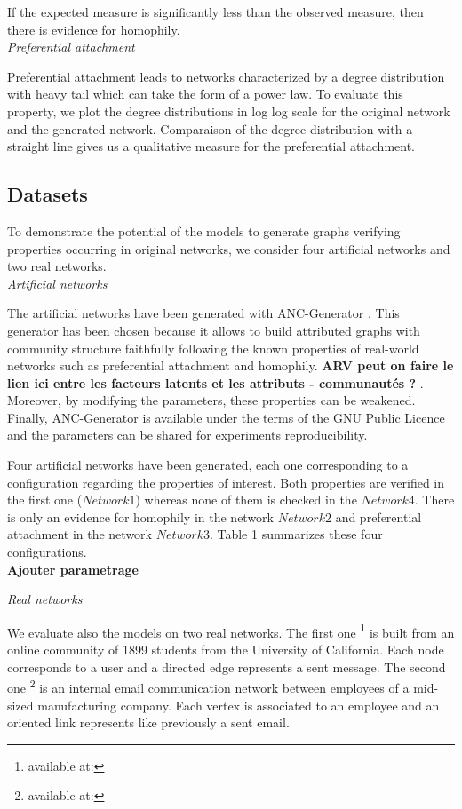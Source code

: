 If the expected measure is significantly less than the observed measure, then there is evidence for homophily.\\

\textit{Preferential attachment}

Preferential attachment leads to networks characterized by a degree distribution with heavy tail which can take the form of a power law. To evaluate this property, we  plot the degree distributions in log log scale for the original network and the generated network. Comparaison of the degree distribution with a straight line gives us a qualitative measure for the preferential attachment.\\

\subsection{Datasets}
To demonstrate the potential of the models to generate graphs verifying properties occurring in original networks, we consider four artificial networks and two real networks.\\

\textit{Artificial networks}

The artificial networks have been generated with ANC-Generator \cite{largeron2015}. This generator has been chosen because it allows to build attributed graphs with community structure faithfully following the known properties of real-world networks such as preferential attachment and homophily. 
\textbf{ ARV peut on faire le lien ici entre les facteurs latents et les attributs - communautés ? }.
Moreover, by modifying the parameters, these properties can be weakened. Finally, ANC-Generator is available under the terms of the GNU Public Licence and the parameters can be shared for experiments reproducibility. 

Four artificial networks have been generated, each one corresponding to a configuration  regarding the properties of interest.
Both properties are verified in the first one ($Network1$) whereas none of them is checked in the $Network4$.  There is only an evidence for homophily in the network $Network2$ and  preferential attachment in the network  $Network3$. Table 1 summarizes these four configurations. \\ 

\textbf{Ajouter parametrage}  

\textit{Real networks}

We evaluate also the models on two  real networks.
The first one \footnote{available at:} is built from an online community of 1899 students from the University of California. Each node corresponds to a user and a directed edge represents a sent message. 
The second one \footnote{available at:} is an internal email communication network between employees of a mid-sized manufacturing company. Each vertex is associated to an employee and an oriented link represents like previously a sent email.

